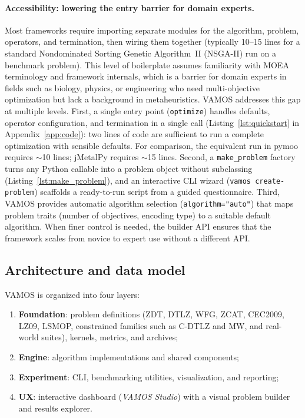 \documentclass[journal]{IEEEtran}
\newcommand{\VAMOS}{VAMOS}
\begin{document}
\paragraph{Accessibility: lowering the entry barrier for domain experts.}
Most frameworks require importing separate modules for the algorithm, problem, operators, and termination, then wiring them together (typically 10--15 lines for a standard Nondominated Sorting Genetic Algorithm~II (NSGA-II) run on a benchmark problem). This level of boilerplate assumes familiarity with MOEA terminology and framework internals, which is a barrier for domain experts in fields such as biology, physics, or engineering who need multi-objective optimization but lack a background in metaheuristics. \VAMOS{} addresses this gap at multiple levels. First, a single entry point (\texttt{optimize}) handles defaults, operator configuration, and termination in a single call (Listing~\ref{lst:quickstart} in Appendix~\ref{app:code}): two lines of code are sufficient to run a complete optimization with sensible defaults. For comparison, the equivalent run in pymoo requires $\sim$10 lines; jMetalPy requires $\sim$15 lines. Second, a \texttt{make\_problem} factory turns any Python callable into a problem object without subclassing (Listing~\ref{lst:make_problem}), and an interactive CLI wizard (\texttt{vamos create-problem}) scaffolds a ready-to-run script from a guided questionnaire. Third, \VAMOS{} provides automatic algorithm selection (\texttt{algorithm="auto"}) that maps problem traits (number of objectives, encoding type) to a suitable default algorithm. When finer control is needed, the builder API ensures that the framework scales from novice to expert use without a different API.

\subsection{Architecture and data model}
\label{sec:architecture}

\VAMOS{} is organized into four layers:
\begin{enumerate}
  \item \textbf{Foundation}: problem definitions (ZDT, DTLZ, WFG, ZCAT, CEC2009, LZ09, LSMOP, constrained families such as C-DTLZ and MW, and real-world suites), kernels, metrics, and archives;
  \item \textbf{Engine}: algorithm implementations and shared components;
  \item \textbf{Experiment}: CLI, benchmarking utilities, visualization, and reporting;
  \item \textbf{UX}: interactive dashboard (\emph{\VAMOS{} Studio}) with a visual problem builder and results explorer.
\end{enumerate}
\end{document}
